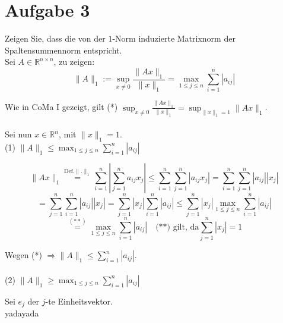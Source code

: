 \documentclass[11pt,a4paper,ngerman]{article}
\begin{document}

\section*{Aufgabe 3}
Zeigen Sie, dass die von der $1$-Norm induzierte Matrixnorm der Spaltensummennorm entspricht. \\

Sei $A \in \mathbb{R}^{n \times n}$, zu zeigen:
$$ \|A \|_1 := \sup_{x \neq 0}{\frac{\|Ax\|_{1}}{\|x\|_{1}}}
                  =\max_{1 \leq j \leq n}{\sum_{i=1}^{n}{|a_{ij}|}} $$

Wie in CoMa I gezeigt, gilt
(*) $\sup_{x \neq 0}{\frac{\|Ax\|_{1}}{\|x\|_{1}}} = \sup_{\|x\|_{1} = 1}{\|Ax\|_{1}}$. \\ \\
Sei nun $x \in \mathbb{R}^{n}$, mit $\|x\|_{1} = 1$.\\

(1) $\|A \|_1 \leq \max_{1 \leq j \leq n}{\sum_{i=1}^{n}{|a_{ij}|}}$ 

$$
\|Ax\|_{1} \stackrel{\text{Def.}\|.\|_{1}}{=}
     \sum_{i=1}^{n}{\left| \sum_{j=1}^{n}{a_{ij}x_j} \right|}
\leq \sum_{i=1}^{n}{\sum_{j=1}^{n}{\left|a_{ij}x_j\right|} }
=    \sum_{i=1}^{n}{\sum_{j=1}^{n}{|a_{ij}||x_j|} }
$$
$$
=    \sum_{j=1}^{n}{\sum_{i=1}^{n}{|a_{ij}||x_j|} }
=    \sum_{j=1}^{n}{|x_j| \sum_{i=1}^{n}{|a_{ij}|} }
\leq \sum_{j=1}^{n}{|x_j| \max_{1\leq j \leq n}{\sum_{i=1}^{n}{|a_{ij}|}} }
$$
$$
\stackrel{(**)}{=} \max_{1\leq j \leq n}{\sum_{i=1}^{n}{|a_{ij}|}} \quad \text{(**) gilt, da} \sum_{j=1}^{n}{|x_j|} = 1
$$

Wegen (*) $\Rightarrow \|A\|_{1} \leq \sum_{i=1}^{n}{|a_{ij}|}$. \\ \\

(2) $\|A \|_1 \geq \max_{1 \leq j \leq n}{\sum_{i=1}^{n}{|a_{ij}|}}$ 


Sei $e_j$ der $j$-te Einheitsvektor.\\
 yadayada

\label{LastPage}
\end{document}
